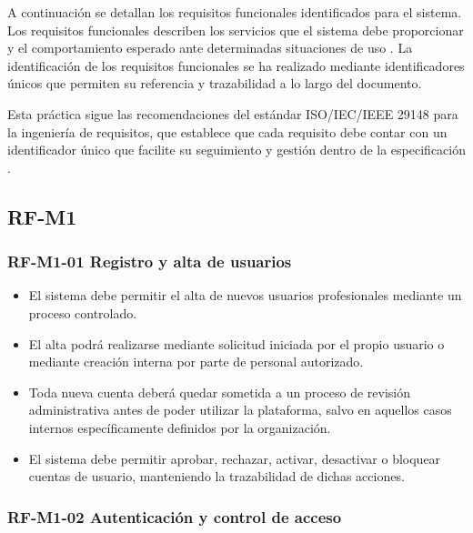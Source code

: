 A continuación se detallan los requisitos funcionales identificados para el sistema. Los requisitos funcionales describen los servicios que el sistema debe proporcionar y el comportamiento esperado ante determinadas situaciones de uso \cite[Chap.~4.1.1, pp.~85--87]{sommerville}. La identificación de los requisitos funcionales se ha realizado mediante identificadores únicos que permiten su referencia y trazabilidad a lo largo del documento.

Esta práctica sigue las recomendaciones del estándar ISO/IEC/IEEE 29148 para la ingeniería de requisitos, que establece que cada requisito debe contar con un identificador único que facilite su seguimiento y gestión dentro de la especificación \cite{ieee29148}.

\subsection{RF-M1}

\vspace{-0.75em}
\subsubsection{RF-M1-01 Registro y alta de usuarios}
\vspace{-1em}

\begin{itemize}
    \item El sistema debe permitir el alta de nuevos usuarios profesionales mediante un proceso controlado.
    \item El alta podrá realizarse mediante solicitud iniciada por el propio usuario o mediante creación interna por parte de personal autorizado.
    \item Toda nueva cuenta deberá quedar sometida a un proceso de revisión administrativa antes de poder utilizar la plataforma, salvo en aquellos casos internos específicamente definidos por la organización.
    \item El sistema debe permitir aprobar, rechazar, activar, desactivar o bloquear cuentas de usuario, manteniendo la trazabilidad de dichas acciones.
\end{itemize}

\vspace{-0.75em}
\subsubsection{RF-M1-02 Autenticación y control de acceso}
\vspace{-1em}

